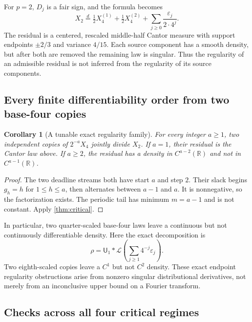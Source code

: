 \documentclass[11pt,a4paper]{article}
\newtheorem{corollary}[theorem]{Corollary}
\theoremstyle{remark}
\newcommand{\R}{\mathbb R}
\newcommand{\Law}{\mathcal L}
\newcommand{\Unif}{\mathsf U}
\newcommand{\eqd}{\overset{d}{=}}
\begin{document}
For $p=2$, $D_j$ is a fair sign, and the formula becomes
\[
 X_2\eqd\tfrac12X_4^{(1)}+\tfrac12X_4^{(2)}
             +\sum_{j\ge0}\frac{\varepsilon_j}{2\cdot4^j}.
\]
The residual is a centered, rescaled middle-half Cantor measure with support
endpoints $\pm2/3$ and variance $4/15$. Each source component has a smooth
density, but after both are removed the remaining law is singular. Thus the
regularity of an admissible residual is not inferred from the regularity of
its source components.

\subsection{Every finite differentiability order from two base-four copies}

\begin{corollary}[A tunable exact regularity family]
\label{cor:tunable}
For every integer $a\ge1$, two independent copies of $2^{-a}X_4$ jointly divide
$X_2$. If $a=1$, their residual is the Cantor law above. If $a\ge2$, the residual
has a density in $C^{a-2}(\R)$ and not in $C^{a-1}(\R)$.
\end{corollary}
\begin{proof}
The two deadline streams both have start $a$ and step $2$. Their slack begins
$g_h=h$ for $1\le h\le a$, then alternates between $a-1$ and $a$.
It is nonnegative, so the factorization exists. The periodic tail has minimum
$m=a-1$ and is not constant. Apply \cref{thm:critical}.
\end{proof}

In particular, two quarter-scaled base-four laws leave a continuous but not
continuously differentiable density. Here the exact decomposition is
\[
 \rho=\Unif_1*\Law\left(\sum_{j\ge1}4^{-j}\varepsilon_j\right).
\]
Two eighth-scaled copies leave a $C^1$ but not $C^2$ density. These exact endpoint
regularity obstructions arise from nonzero singular distributional derivatives,
not merely from an inconclusive upper bound on a Fourier transform.

\subsection{Checks across all four critical regimes}
\end{document}
